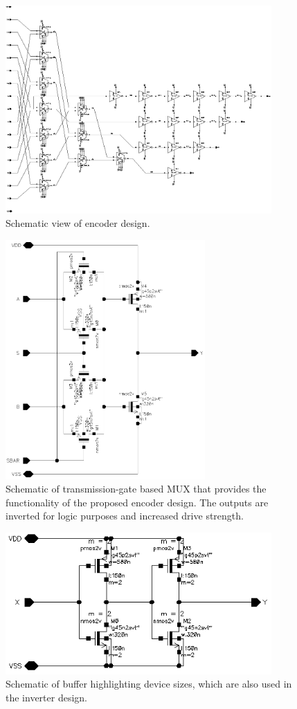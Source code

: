 \documentclass[11pt,letterpaper]{article}
\begin{document}
\begin{figure}[htbp!]
    \centering
    \includegraphics[width=4in]{encoder.eps}
    \caption{Schematic view of encoder design.}\label{Fig:encoder}
\end{figure}

\begin{figure}[htbp!]
    \centering
    \includegraphics[width=3in]{tgmux2.eps}
    \caption{Schematic of transmission-gate based MUX that provides the functionality of the proposed encoder design. The outputs are inverted for logic purposes and increased drive strength.}\label{Fig:tgmux2}
\end{figure}

\begin{figure}[htbp!]
    \centering
    \includegraphics[width=4in]{buf.eps}
    \caption{Schematic of buffer highlighting device sizes, which are also used in the inverter design.}\label{Fig:buf}
\end{figure}
\end{document}
